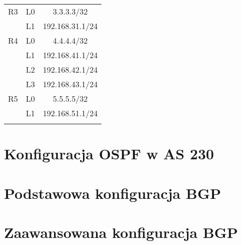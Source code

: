 \documentclass[a4paper,12pt,notitlepage]{article}
\begin{document}
\begin{table}[htbp]
{\begin{tabular}{|*3c|}
        \hline
            R3 & L0 & 3.3.3.3/32      \\
               & L1 & 192.168.31.1/24 \\
        \hline
            R4 & L0 & 4.4.4.4/32      \\
               & L1 & 192.168.41.1/24 \\
               & L2 & 192.168.42.1/24 \\
               & L3 & 192.168.43.1/24 \\
        \hline
            R5 & L0 & 5.5.5.5/32      \\
               & L1 & 192.168.51.1/24 \\
        \hhline{|===|}
    \end{tabular}}
\end{table}

\section{Konfiguracja OSPF w AS 230}

\section{Podstawowa konfiguracja BGP}

\section{Zaawansowana konfiguracja BGP}
\end{document}
